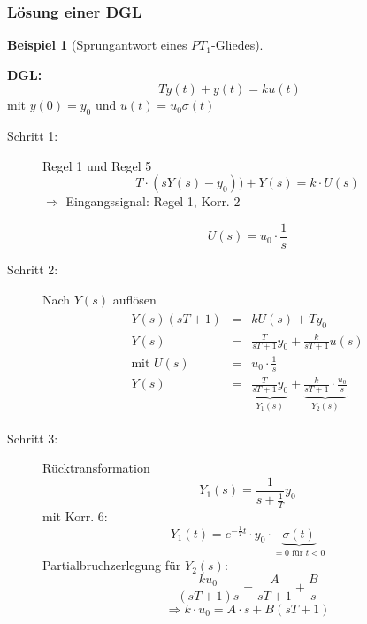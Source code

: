 \documentclass[12pt,a4paper,ngerman]{scrartcl}
\newtheorem{bsp}{Beispiel}[section] %
\begin{document}
\subsubsection{Lösung einer DGL}
\begin{bsp}[Sprungantwort eines $PT_1$-Gliedes]
\end{bsp}
\textbf{DGL:}
\begin{equation*}
  T\dot{y}(t)+y(t)=ku(t)
\end{equation*}
mit $y(0)=y_0$ und $u(t)=u_0\sigma (t)$
\begin{description}
\item[Schritt 1: ] Regel 1 und Regel 5
  \begin{equation*}
    T\cdot (sY(s)-y_0))+Y(s)=k\cdot U(s)
  \end{equation*}
$\Rightarrow$ Eingangssignal: Regel 1, Korr. 2

\begin{equation*}
U(s)=u_0 \cdot \frac{1}{s}
\end{equation*}

\item[Schritt 2:] Nach $Y(s)$ auflösen
  \begin{align*}
    \begin{array}{llllll}
      Y(s)(sT+1)&=&kU(s)+Ty_0\\
      Y(s)&=& \frac{T}{sT+1}y_0+\frac{k}{sT+1}u(s)\\
      \text{mit } U(s)&=&u_0\cdot \frac{1}{s}\\
      Y(s)&=&\underbrace{\frac{T}{sT+1}y_0}_{Y_1(s)}+\underbrace{\frac{k}{sT+1}\cdot \frac{u_0}{s}}_{Y_2(s)}
    \end{array}
  \end{align*}
\item[Schritt 3:] Rücktransformation
  \begin{equation*}
    Y_1(s)=\frac{1}{s+\frac{1}{T}}y_0 
  \end{equation*}
mit Korr. 6:
\begin{equation*}
  Y_1(t)=e^{-\frac{1}{T}t}\cdot y_0 \cdot \underbrace{\sigma (t)}_{=0 \text{ für }t<0} 
\end{equation*}
Partialbruchzerlegung für $Y_2(s)$:
\begin{equation*}
\frac{k u_0}{(sT+1)s}=\frac{A}{sT+1}+\frac{B}{s}
\end{equation*}
\begin{equation*}
  \Rightarrow k\cdot u_0=A\cdot s+B(sT+1)
\end{equation*}
\end{description}
\end{document}
